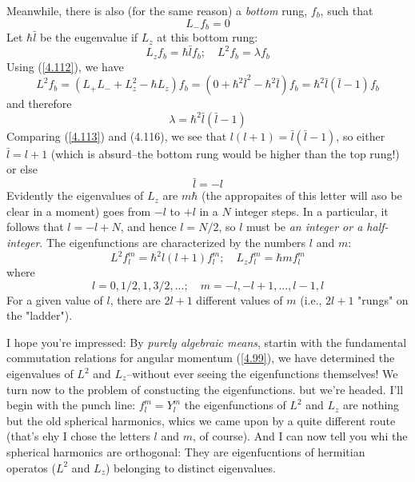 Meanwhile, there is also (for the same reason) a \textit{bottom} rung, $f_b$, such that
\begin{equation}\label{4.114}
	L_-f_b=0
\end{equation}
Let $\hbar\bar{l}$ be the eugenvalue if $L_z$ at this bottom rung:
\begin{equation}\label{4.115}
	L_zf_b=\hbar\bar{l}f_b;\quad L^2f_b=\lambda f_b
\end{equation}
Using (\ref{4.112}), we have $$L^2f_b=(L_+L_-+L_z^2-\hbar L_z)f_b=(0+\hbar^2\bar{l}^2-\hbar^2\bar{l})f_b=\hbar^2\bar{l}(\bar{l}-1)f_b$$ and therefore
\begin{equation}\label{4.116}
	\lambda = \hbar^2\bar{l}(\bar{l}-1)
\end{equation}
Comparing (\ref{4.113}) and ({4.116}), we see that $l(l+1)=\bar{l}(\bar{l}-1)$, so either $\bar{l}=l+1$ (which is absurd--the bottom rung would be higher than the top rung!) or else
\begin{equation}\label{4.117}
	\bar{l}=-l
\end{equation}
Evidently the eigenvalues of $L_z$ are $m\hbar$ (the appropaites of this letter will aso be clear in a moment) goes from $-l$ to $+l$ in a $N$ integer steps. In a particular, it follows that $l=-l+N$, and hence $l=N/2$, so $l$ must be \textit{an integer or a half-integer}. The eigenfunctions are characterized by the numbers $l$ and $m$:
\begin{equation}\label{4.118}
	\boxed{L^2f_l^m=\hbar^2l(l+1)f_l^m;\quad L_zf_l^m=\hbar mf_l^m}
\end{equation}
where 
\begin{equation}\label{4.119}
	l=0,1/2,1,3/2,...;\quad m=-l, -l+1,..., l-1, l
\end{equation}
For a given value of $l$, there are $2l+1$ different values of $m$ (i.e., $2l+1$ "rungs" on the "ladder"). 

I hope you're impressed: By \textit{purely algebraic means}, startin with the fundamental commutation relations for angular momentum (\ref{4.99}), we have determined the eigenvalues of $L^2$ and $L_z$--without ever seeing the eigenfunctions themselves! We turn now to the problem of constucting the eigenfunctions. but we're headed. I'll begin with the punch line: $f_l^m=Y_l^m$ the eigenfunctions of $L^2$ and $L_z$ are nothing but the old spherical harmonics, whics we came upon by a quite different route (that's ehy I chose the letters $l$ and $m$, of course). And I can now tell you whi the spherical harmonics are orthogonal: They are eigenfucntions of hermitian operatos ($L^2$ and $L_z$) belonging to distinct eigenvalues.

